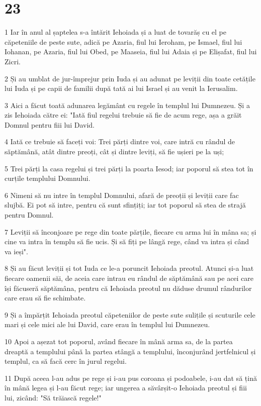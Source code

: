 \chapter{23}

\par 1 Iar în anul al șaptelea s-a întărit Iehoiada și a luat de tovarăș cu el pe căpeteniile de peste sute, adică pe Azaria, fiul lui Ieroham, pe Ismael, fiul lui Iohanan, pe Azaria, fiul lui Obed, pe Maaseia, fiul lui Adaia și pe Elișafat, fiul lui Zicri.
\par 2 Și au umblat de jur-împrejur prin Iuda și au adunat pe leviții din toate cetățile lui Iuda și pe capii de familii după tată ai lui Israel și au venit la Ierusalim.
\par 3 Aici a făcut toată adunarea legământ cu regele în templul lui Dumnezeu. Și a zis Iehoiada către ei: "Iată fiul regelui trebuie să fie de acum rege, așa a grăit Domnul pentru fiii lui David.
\par 4 Iată ce trebuie să faceți voi: Trei părți dintre voi, care intră cu rândul de săptămână, atât dintre preoți, cât și dintre leviți, să fie ușieri pe la uși;
\par 5 Trei părți la casa regelui și trei părți la poarta Iesod; iar poporul să stea tot în curțile templului Domnului.
\par 6 Nimeni să nu intre în templul Domnului, afară de preoții și leviții care fac slujbă. Ei pot să intre, pentru că sunt sfințiți; iar tot poporul să stea de strajă pentru Domnul.
\par 7 Leviții să înconjoare pe rege din toate părțile, fiecare cu arma lui în mâna sa; și cine va intra în templu să fie ucis. Și să fiți pe lângă rege, când va intra și când va ieși".
\par 8 Și au făcut leviții și tot Iuda ce le-a poruncit Iehoiada preotul. Atunci și-a luat fiecare oamenii săi, de aceia care intrau eu rândul de săptămână sau pe acei care își făcuseră săptămâna, pentru că Iehoiada preotul nu dăduse drumul rândurilor care erau să fie schimbate.
\par 9 Și a împărțit Iehoiada preotul căpeteniilor de peste sute sulițile și scuturile cele mari și cele mici ale lui David, care erau în templul lui Dumnezeu.
\par 10 Apoi a așezat tot poporul, având fiecare în mână arma sa, de la partea dreaptă a templului până la partea stângă a templului, înconjurând jertfelnicul și templul, ca să facă cerc în jurul regelui.
\par 11 După aceea l-au adus pe rege și i-au pus coroana și podoabele, i-au dat să țină în mână legea și l-au făcut rege; iar ungerea a săvârșit-o Iehoiada preotul și fiii lui, zicând: "Să trăiască regele!"

